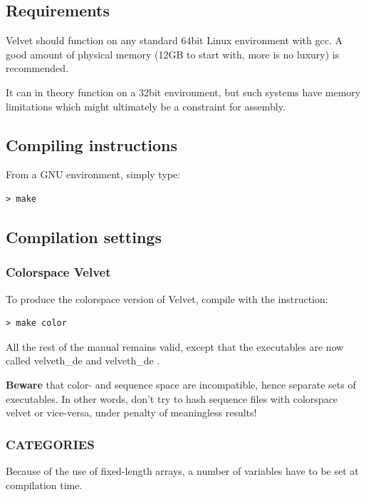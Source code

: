 \documentclass{article}
\begin{document}
\subsection{Requirements}

	Velvet should function on any standard 64bit Linux environment with
gcc. A good amount of physical memory (12GB to start with, more is no luxury)
is recommended. 
	
	It can in theory function on a 32bit environment, but such systems have memory limitations which might ultimately be a constraint for assembly.

\subsection{Compiling instructions}

\label{sec:compilation}

From a GNU environment, simply type:

\begin{verbatim}
> make
\end{verbatim}

\subsection{Compilation settings}

\subsubsection{Colorspace Velvet}

To produce the colorspace version of Velvet, compile with the instruction:

\begin{verbatim}
> make color
\end{verbatim}

All the rest of the manual remains valid, except that the executables are now called velveth\_de and velveth\_de . 

\textbf{Beware} that color- and sequence space are incompatible, hence separate sets of executables. In other words, don't try to hash sequence files with colorspace velvet or vice-versa, under penalty of meaningless results!

\subsubsection{CATEGORIES}

Because of the use of fixed-length arrays, a number of variables have to be set at compilation time. 
\end{document}
